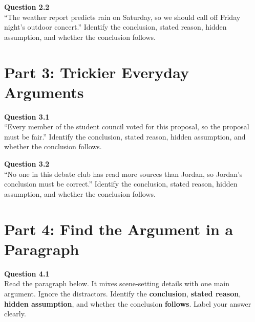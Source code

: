 \documentclass[12pt]{article}
\begin{document}

\textbf{Question 2.2}\\[-0.15em]
``The weather report predicts rain on Saturday, so we should call off Friday night's outdoor concert.'' Identify the conclusion, stated reason, hidden assumption, and whether the conclusion follows.


\newpage

\section*{Part 3: Trickier Everyday Arguments}

\textbf{Question 3.1}\\[-0.15em]
``Every member of the student council voted for this proposal, so the proposal must be fair.'' Identify the conclusion, stated reason, hidden assumption, and whether the conclusion follows.


\textbf{Question 3.2}\\[-0.15em]
``No one in this debate club has read more sources than Jordan, so Jordan's conclusion must be correct.'' Identify the conclusion, stated reason, hidden assumption, and whether the conclusion follows.


\newpage

\section*{Part 4: Find the Argument in a Paragraph}

\textbf{Question 4.1}\\[-0.15em]
Read the paragraph below. It mixes scene-setting details with one main argument. Ignore the distractors. Identify the \textbf{conclusion}, \textbf{stated reason}, \textbf{hidden assumption}, and whether the conclusion \textbf{follows}. Label your answer clearly.

\vspace{0.2em}

\noindent{}

\end{document}
